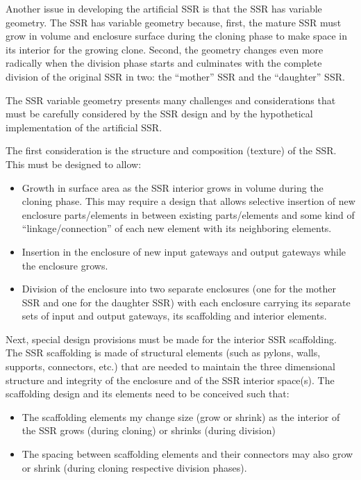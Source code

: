 Another issue in developing the artificial SSR is that the SSR has variable
geometry.  The SSR has variable geometry because, first, the mature SSR must 
grow in volume and enclosure surface during the cloning phase to make space 
in its interior for the growing clone. Second, the geometry changes even more 
radically when the division phase
starts and culminates with the complete division of the original SSR in
two: the “mother” SSR and the “daughter” SSR.

The SSR variable geometry presents many challenges and considerations that must
be carefully considered by the SSR design and by the hypothetical
implementation of the artificial SSR.

The first consideration is the structure and composition (texture) of the SSR.  This
must be designed to allow:
\begin{itemize}
\item Growth in surface area as the SSR interior grows in volume during the
cloning phase. This may require a design that allows selective
insertion of new enclosure parts/elements in between existing
parts/elements and some kind of “linkage/connection” of each new
element with its neighboring elements.
\item Insertion in the enclosure of new input gateways and output
gateways while the enclosure grows.
\item Division of the enclosure into two separate enclosures (one for
the mother SSR and one for the daughter SSR)  with each enclosure
carrying its separate sets of input and output gateways, its
scaffolding and interior elements.
\end{itemize}

Next, special design provisions must be made for the interior SSR
scaffolding. The SSR scaffolding is made of structural
elements (such as pylons, walls, supports, connectors, etc.) that are needed to
maintain the three dimensional structure and integrity of the enclosure
and of the SSR interior space(s). The scaffolding design and its
elements need to be conceived such that:

\begin{itemize}
\item The scaffolding elements my change size (grow or shrink) as the
interior of the SSR grows (during cloning) or shrinks (during division)
\item The spacing between scaffolding elements and their connectors may
also grow or shrink (during cloning respective division phases).
\end{itemize}

